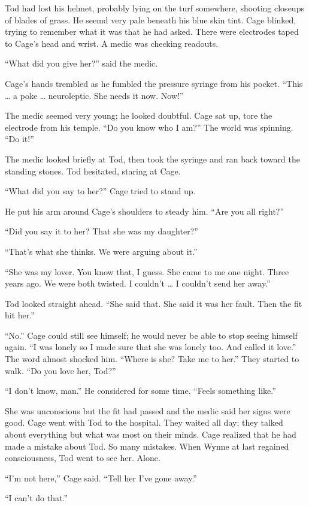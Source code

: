 Tod had lost his helmet, probably lying on the turf somewhere, shooting closeups of blades of grass. He seemd very pale beneath his blue skin tint. Cage blinked, trying to remember what it was that he had asked. There were electrodes taped to Cage’s head and wrist. A medic was checking readouts.

“What did you give her?” said the medic.

Cage’s hands trembled as he fumbled the pressure syringe from his pocket. “This … a poke … neuroleptic. She needs it now. Now!”

The medic seemed very young; he looked doubtful. Cage sat up, tore the electrode from his temple. “Do you know who I am?” The world was spinning. “Do it!”

The medic looked briefly at Tod, then took the syringe and ran back toward the standing stones. Tod hesitated, staring at Cage.

“What did you say to her?” Cage tried to stand up.

He put his arm around Cage’s shoulders to steady him. “Are you all right?”

“Did you say it to her? That she was my daughter?”

“That’s what she thinks. We were arguing about it.”

“She was my lover. You know that, I guess. She came to me one night. Three years ago. We were both twisted. I couldn’t … I couldn’t send her away.”

Tod looked straight ahead. “She said that. She said it was her fault. Then the fit hit her.”

“No.” Cage could still see himself; he would never be able to stop seeing himself again. “I was lonely so I made sure that she was lonely too. And called it love.” The word almost shocked him. “Where is she? Take me to her.” They started to walk. “Do you love her, Tod?”

“I don’t know, man.” He considered for some time. “Feels something like.”

She was unconscious but the fit had passed and the medic said her signs were good. Cage went with Tod to the hospital. They waited all day; they talked about everything but what was most on their minds. Cage realized that he had made a mistake about Tod. So many mistakes. When Wynne at last regained consciousness, Tod went to see her. Alone.

“I’m not here,” Cage said. “Tell her I’ve gone away.”

“I can’t do that.”

